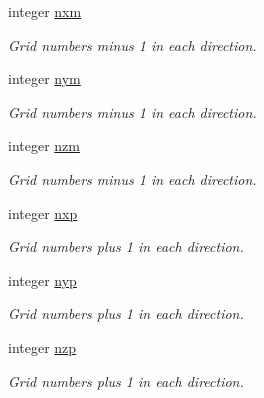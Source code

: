 \textbf{ }\par
\begin{DoxyCompactItemize}
\item 
integer \mbox{\hyperlink{namespaceglobal_aa37f5fe09139707ac1723302127436b1}{nxm}}
\begin{DoxyCompactList}\small\item\em Grid numbers minus 1 in each direction. \end{DoxyCompactList}\item 
integer \mbox{\hyperlink{namespaceglobal_a9852876e90514ccc182c0ed0b27cdaad}{nym}}
\begin{DoxyCompactList}\small\item\em Grid numbers minus 1 in each direction. \end{DoxyCompactList}\item 
integer \mbox{\hyperlink{namespaceglobal_a76e27e2001870f6606e51d33a2c70f60}{nzm}}
\begin{DoxyCompactList}\small\item\em Grid numbers minus 1 in each direction. \end{DoxyCompactList}\end{DoxyCompactItemize}

\textbf{ }\par
\begin{DoxyCompactItemize}
\item 
integer \mbox{\hyperlink{namespaceglobal_a227001d8177d0295b61a39948436adaa}{nxp}}
\begin{DoxyCompactList}\small\item\em Grid numbers plus 1 in each direction. \end{DoxyCompactList}\item 
integer \mbox{\hyperlink{namespaceglobal_a868bbe46b97daa7ff6c962fff16bbf2f}{nyp}}
\begin{DoxyCompactList}\small\item\em Grid numbers plus 1 in each direction. \end{DoxyCompactList}\item 
integer \mbox{\hyperlink{namespaceglobal_ab376cd7d790b630ad83ffcded3c56366}{nzp}}
\begin{DoxyCompactList}\small\item\em Grid numbers plus 1 in each direction. \end{DoxyCompactList}\end{DoxyCompactItemize}

